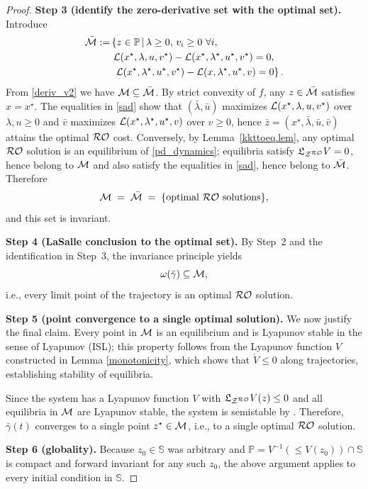 \documentclass[journal,twoside,web]{ieeecolor}
\newcommand{\rev}[1]{\textcolor{revisionblue}{#1}}
\begin{document}
\begin{proof}
\medskip
\rev{\textbf{Step 3 (identify the zero-derivative set with the optimal set).}
Introduce
\begin{align}
\bar{\cal M}:=& \left\{z \in \mathbb P\,\middle|\,\lambda\geq 0,\, v_i\geq 0\ \forall i,\right.\nonumber\\
&\ {\cal L}(x^\star,\lambda,u,v^\star)-{\cal L}(x^\star,\lambda^\star,u^\star,v^\star)=0,\nonumber\\
&\left.\ {\cal L}(x^\star,\lambda^\star,u^\star,v^\star)-{\cal L}(x,\lambda^\star,u^\star,v)=0 \right\}.
\label{sad}
\end{align}
From \eqref{deriv_v2} we have ${\cal M}\subseteq \bar{\cal M}$.
By strict convexity of $f$, any $z\in\bar{\cal M}$ satisfies $x=x^\star$. The equalities in \eqref{sad} show that $(\bar\lambda,\bar u)$ maximizes ${\cal L}(x^\star,\lambda,u,v^\star)$ over $\lambda,u\ge 0$ and $\bar v$ maximizes ${\cal L}(x^\star,\lambda^\star,u^\star,v)$ over $v\ge 0$, hence $\bar z=(x^\star,\bar\lambda,\bar u,\bar v)$ attains the optimal ${\cal RO}$ cost.
Conversely, by Lemma~\ref{kkttoeq.lem}, any optimal ${\cal RO}$ solution is an equilibrium of \eqref{pd_dynamics}; equilibria satisfy $\mathfrak{L}_{{\cal Z}^{\cal RO}}V=0$, hence belong to ${\cal M}$ and also satisfy the equalities in \eqref{sad}, hence belong to $\bar{\cal M}$. Therefore
\[
{\cal M}\;=\;\bar{\cal M}\;=\;\{\text{optimal ${\cal RO}$ solutions}\},
\]
and this set is invariant.}

\medskip
\rev{\textbf{Step 4 (LaSalle conclusion to the optimal set).}
By Step~2 and the identification in Step~3, the invariance principle yields
\[
\omega(\bar\gamma)\subseteq {\cal M},
\]
i.e., every limit point of the trajectory is an optimal ${\cal RO}$ solution.}

\medskip
\rev{\textbf{Step 5 (point convergence to a single optimal solution).}
We now justify the final claim. Every point in ${\cal M}$ is an equilibrium and is Lyapunov stable in the sense of Lyapunov (ISL); this property follows from the Lyapunov function $V$ constructed in Lemma \ref{monotonicity}, which shows that $\dot{V} \leq 0$ along trajectories, establishing stability of equilibria.

Since the system has a Lyapunov function $V$ with $\mathfrak{L}_{{\cal Z}^{\cal RO}}V(z)\le 0$ and all equilibria in ${\cal M}$ are Lyapunov stable, the system is semistable by \cite[Theorem~4.19]{haddad}. Therefore, $\bar\gamma(t)$ converges to a single point $z^\star\in{\cal M}$, i.e., to a single optimal ${\cal RO}$ solution.}

\medskip
\rev{\textbf{Step 6 (globality).}
Because $z_0\in\mathbb S$ was arbitrary and $\mathbb P=V^{-1}(\le V(z_0))\cap\mathbb S$ is compact and forward invariant for any such $z_0$, the above argument applies to every initial condition in $\mathbb S$.}
\end{proof}
\end{document}
